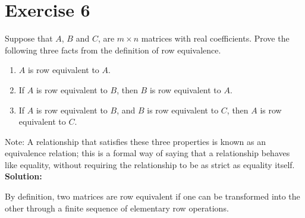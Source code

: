 \documentclass{article}
\begin{document}
\section*{Exercise 6}
Suppose that $A$, $B$ and $C$, are $m \times n$ matrices with real coefficients. Prove the following three facts from the definition of row equivalence.
\begin{enumerate}[label=(\alph*)]
\item $A$ is row equivalent to $A$.
\item If $A$ is row equivalent to $B$, then $B$ is row equivalent to $A$.
\item If $A$ is row equivalent to $B$, and $B$ is row equivalent to $C$, then $A$ is row equivalent to $C$.
\end{enumerate}
Note: A relationship that satisfies these three properties is known as an equivalence relation; this is a formal way of saying that a relationship behaves like equality, without requiring the relationship to be as strict as equality itself. \\

\textbf{Solution:}

By definition, two matrices are row equivalent if one can be transformed into the other through a finite sequence of elementary row operations.
\end{document}
